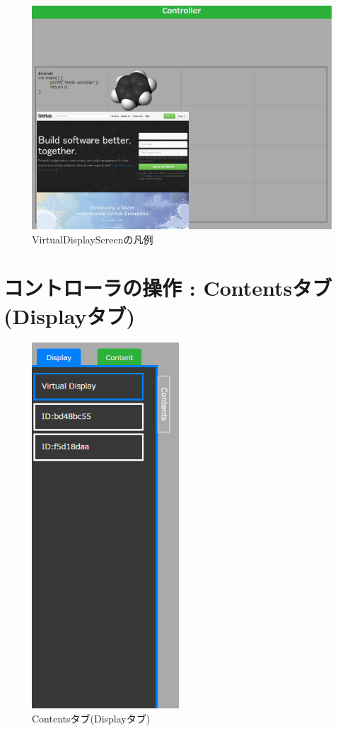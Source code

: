 \documentclass[a4paper,10pt,oneside]{jsbook}
\begin{document}
\begin{figure}[htbp]
	\begin{center}
		\includegraphics[width=15.5cm]{image/TDD_View.PNG}
	\end{center}
	\caption{VirtualDisplayScreenの凡例}
	\label{fig:vds}
\end{figure}


\newpage


\section{コントローラの操作 : Contentsタブ(Displayタブ)}
\begin{figure}
	\begin{center}
		\includegraphics[width=5.5cm]{image/Display_TAB_2conn.PNG}
	\end{center}
	\caption{Contentsタブ(Displayタブ)}
	\label{fig:contentstab}
\end{figure}
\end{document}
